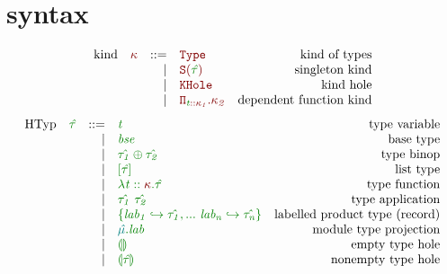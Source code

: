 \documentclass[12pt,fleqn]{article}
\newcommand{\red}[1]{\textcolor{red}{#1}}
\newcommand{\green}[1]{\textcolor{green}{#1}}
\newcommand{\teal}[1]{\textcolor{teal}{#1}}
\newcommand{\redtt}[1]{\red{\mathtt{#1}}}
\newcommand{\greentt}[1]{\green{\mathtt{#1}}}
\newcommand{\redit}[1]{\red{\mathit{#1}}}
\newcommand{\greenit}[1]{\green{\mathit{#1}}}
\newcommand{\tealit}[1]{\teal{\mathit{#1}}}
\newcommand{\knd}[1][]{\redit{\kappa#1}}
\newcommand{\typ}[1][]{\greenit{\hat{\tau#1}}}
\newcommand{\typvar}[1][]{\greenit{t#1}}
\renewcommand{\mod}[1][]{\tealit{\hat{\mu#1}}}
\newcommand{\lab}[1][]{\mathit{lab#1}}
\newcommand{\Type}{\redtt{Type}}
\newcommand{\SKind}[1]{\redtt{S(#1)}}
\newcommand{\KHole}{\redtt{KHole}}
\newcommand{\DepFunKind}[2]{\redtt{\Pi_{#1}.{#2}}}
\newcommand{\DepProdKind}[2]{\redtt{\Sigma_{#1}.{#2}}}
\newcommand{\TypCFun}[2]{\greentt{\lambda #1.#2}}
\newcommand{\TypCAp}[2]{\greentt{#1~#2}}
\newcommand{\TypCPair}[2]{\greentt{\langle #1, #2\rangle}}
\newcommand{\TypCPairPrjL}[1]{\greentt{\pi_1~#1}}
\newcommand{\TypCPairPrjR}[1]{\greentt{\pi_2~#1}}
\newcommand{\ListTyp}[1]{\greentt{[#1]}}
\newcommand{\TypCHole}[1][]{\greentt{\llparenthesis #1 \rrparenthesis}}
\begin{document}
\section{syntax}
\[\begin{array}{rcrlr}
    \textrm{kind} & \knd & ::=
                  & \Type & \textrm{kind of types} \\
                  && \vert & \SKind{\typ} & \textrm{singleton kind} \\
                  && \vert & \KHole & \textrm{kind hole} \\
                  && \vert & \DepFunKind{\typvar :: \knd[_1]}{\knd[_2]} & \textrm{dependent function kind} \\
\end{array}\]
\[\begin{array}{rcrlr}
    \textrm{HTyp} & \typ & ::=
                           & \typvar & \textrm{type variable} \\
                           && \vert & \greenit{bse} & \textrm{base type} \\
                           && \vert & \greentt{\typ[_1] \oplus \typ[_2]} & \textrm{type binop} \\
                           && \vert & \ListTyp{\typ} & \textrm{list type} \\
                           && \vert & \TypCFun{\typvar :: \knd}{\typ} & \textrm{type function} \\
                           && \vert & \TypCAp{\typ[_1]}{\typ[_2]} & \textrm{type application} \\
                           && \vert & \greentt{\{\lab[_1] \hookrightarrow \typ[_1], ...~\lab[_n] \hookrightarrow \typ[_n]\}} & \textrm{labelled product type (record)} \\
                           && \vert & \greentt{\mod.\lab} & \textrm{module type projection} \\
                           && \vert & \TypCHole & \textrm{empty type hole} \\
                           && \vert & \TypCHole[\typ] & \textrm{nonempty type hole} \\
\end{array}\]
\end{document}

